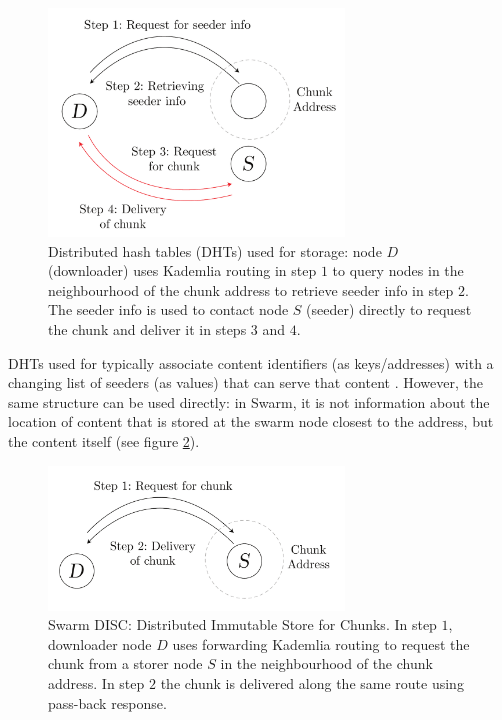 \begin{figure}[htbp]
   \centering
   \includegraphics[width=0.7\textwidth]{fig/dht.pdf}
   \caption[Distributed hash tables (DHTs) \statusgreen]{Distributed hash tables (DHTs) used for storage:  node $D$ (downloader) uses Kademlia routing in step $1$ to query nodes in the neighbourhood of the chunk address to retrieve seeder info in step $2$. The seeder info is used to contact node $S$ (seeder) directly to request the chunk and deliver it in steps $3$ and $4$.}
   \label{fig:DHT}
\end{figure}

DHTs used for  typically associate content identifiers (as keys/addresses) with a changing list of seeders (as values) that can serve that content \cite{ipfs2014, crosby2007analysis}. However, the same structure can be used directly: in Swarm, it is not information about the location of content that is stored at the swarm node closest to the address, but the content itself (see figure \ref{fig:disc}). 


\begin{figure}[htbp]
   \centering
   \includegraphics[width=0.7\textwidth]{fig/disc.pdf}
   \caption[Swarm DISC: Distributed Immutable Store for Chunks \statusgreen]{Swarm DISC:  Distributed Immutable Store for Chunks. In step $1$, downloader node $D$ uses forwarding Kademlia routing to request the chunk from a storer node $S$ in the neighbourhood of the chunk address. In step $2$ the chunk is delivered along the same route using pass-back response.   }
   \label{fig:disc}
\end{figure}

